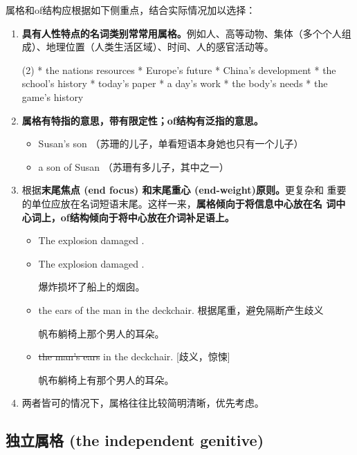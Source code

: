 属格和of结构应根据如下侧重点，结合实际情况加以选择：
\begin{enumerate}
\item \textbf{具有人性特点的名词类别常常用属格。}例如人、高等动物、集体（多个个人组
  成）、地理位置（人类生活区域）、时间、人的感官活动等。
  \begin{taskitem}(2)
    * the nations resources
    * Europe's future
    * China's development
    * the school's history
    * today's paper
    * a day's work
    * the body's needs
    * the game's history
  \end{taskitem}

\item \textbf{属格有特指的意思，带有限定性；of结构有泛指的意思。}
  \begin{itemize}
  \item Susan's son （苏珊的儿子，单看短语本身她也只有一个儿子）

  \item a son of Susan （苏珊有多儿子，其中之一）
  \end{itemize}

\item 根据\textbf{末尾焦点 (end focus) 和末尾重心 (end-weight)原则。}更复杂和
  重要的单位应放在名词短语末尾。这样一来，\textbf{属格倾向于将信息中心放在名
    词中心词上，of结构倾向于将中心放在介词补足语上。}

  \begin{itemize}
  \item The explosion damaged .
  \item The explosion damaged .

    爆炸损坏了船上的烟囱。

  \item the ears of the man in the deckchair. 根据尾重，避免隔断产生歧义

    帆布躺椅上那个男人的耳朵。
  \item \sout{the man's ears} in the deckchair. [歧义，惊悚]

    帆布躺椅上有那个男人的耳朵。
  \end{itemize}

\item 两者皆可的情况下，属格往往比较简明清晰，优先考虑。
\end{enumerate}


\subsection{独立属格 (the independent genitive)}


